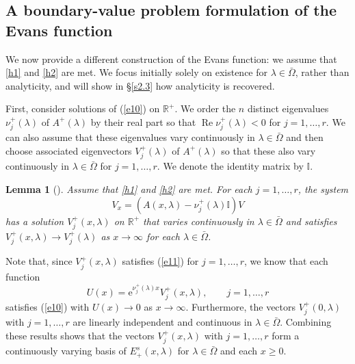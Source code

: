 \documentclass[10pt]{article}
\newtheorem{Lemma}{Lemma}[section]
\numberwithin{equation}{section}
\def\Re{\mathop\mathrm{Re}\nolimits}
\def\id{\mathbb{I}}
\newcommand{\R}{\mathbb{R}}
\newcommand{\rme}{\mathrm{e}}
\begin{document}

\subsection{A boundary-value problem formulation of the Evans function}\label{s2.2}

We now provide a different construction of the Evans function: we assume that \ref{h1} and \ref{h2} are met. We focus initially solely on existence for $\lambda\in\bar\Omega$, rather than analyticity, and will show in \S\ref{s2.3} how analyticity is recovered.

First, consider solutions of (\ref{e10}) on $\R^+$. We order the $n$ distinct eigenvalues $\nu_j^+(\lambda)$ of $A^+(\lambda)$ by their real part so that $\Re\nu^+_j(\lambda)<0$ for $j=1,\ldots,r$. We can also assume that these eigenvalues vary continuously in $\lambda\in\bar\Omega$ and then choose associated eigenvectors $V^+_j(\lambda)$ of $A^+(\lambda)$ so that these also vary continuously in $\lambda\in\bar\Omega$ for $j=1,\ldots,r$. We denote the identity matrix by $\id$.

\begin{Lemma}[{\citep[Ch.~3.8]{CodLev}}]\label{l1}
Assume that \ref{h1} and \ref{h2} are met. For each $j=1,\ldots,r$, the system
\begin{equation}\label{e11}
V_x = (A(x,\lambda)-\nu^+_j(\lambda)\id) V
\end{equation}
has a solution $V^+_j(x,\lambda)$ on $\R^+$ that varies continuously in $\lambda\in\bar\Omega$ and satisfies $V^+_j(x,\lambda)\to V^+_j(\lambda)$ as $x\to\infty$ for each $\lambda\in\bar\Omega$.
\end{Lemma}

Note that, since $V^+_j(x,\lambda)$ satisfies (\ref{e11}) for $j=1,\ldots,r$, we know that each function
\begin{equation}\label{e13}
U(x) = \rme^{\nu^+_j(\lambda)x} V^+_j(x,\lambda), \qquad j=1,\ldots,r
\end{equation}
satisfies (\ref{e10}) with $U(x)\to0$ as $x\to\infty$. Furthermore, the vectors $V^+_j(0,\lambda)$ with $j=1,\ldots,r$ are linearly independent and continuous in $\lambda\in\bar\Omega$. Combining these results shows that the vectors $V^+_j(x,\lambda)$ with $j=1,\ldots,r$ form a continuously varying basis of $E^s_+(x,\lambda)$ for $\lambda\in\bar\Omega$ and each $x\geq0$.
\end{document}
